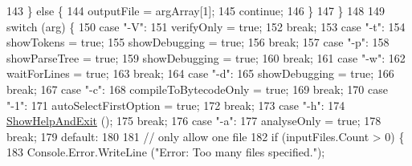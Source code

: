 \begin{DoxyCode}
143                     \} \textcolor{keywordflow}{else} \{
144                         outputFile = argArray[1];
145                         \textcolor{keywordflow}{continue};
146                     \}
147                 \}
148 
149                 \textcolor{keywordflow}{switch} (arg) \{
150                 \textcolor{keywordflow}{case} \textcolor{stringliteral}{"-V"}:
151                     verifyOnly = \textcolor{keyword}{true};
152                     \textcolor{keywordflow}{break};
153                 \textcolor{keywordflow}{case} \textcolor{stringliteral}{"-t"}:
154                     showTokens = \textcolor{keyword}{true};
155                     showDebugging = \textcolor{keyword}{true};
156                     \textcolor{keywordflow}{break};
157                 \textcolor{keywordflow}{case} \textcolor{stringliteral}{"-p"}:
158                     showParseTree = \textcolor{keyword}{true};
159                     showDebugging = \textcolor{keyword}{true};
160                     \textcolor{keywordflow}{break};
161                 \textcolor{keywordflow}{case} \textcolor{stringliteral}{"-w"}:
162                     waitForLines = \textcolor{keyword}{true};
163                     \textcolor{keywordflow}{break};
164                 \textcolor{keywordflow}{case} \textcolor{stringliteral}{"-d"}:
165                     showDebugging = \textcolor{keyword}{true};
166                     \textcolor{keywordflow}{break};
167                 \textcolor{keywordflow}{case} \textcolor{stringliteral}{"-c"}:
168                     compileToBytecodeOnly = \textcolor{keyword}{true};
169                     \textcolor{keywordflow}{break};
170                 \textcolor{keywordflow}{case} \textcolor{stringliteral}{"-1"}:
171                     autoSelectFirstOption = \textcolor{keyword}{true};
172                     \textcolor{keywordflow}{break};
173                 \textcolor{keywordflow}{case} \textcolor{stringliteral}{"-h"}:
174                     \hyperlink{a00092_a0ce7698dabf6d60f3cd33fe5d23c11b3}{ShowHelpAndExit} ();
175                     \textcolor{keywordflow}{break};
176                 \textcolor{keywordflow}{case} \textcolor{stringliteral}{"-a"}:
177                     analyseOnly = \textcolor{keyword}{true};
178                     \textcolor{keywordflow}{break};
179                 \textcolor{keywordflow}{default}:
180 
181                     \textcolor{comment}{// only allow one file}
182                     \textcolor{keywordflow}{if} (inputFiles.Count > 0) \{
183                         Console.Error.WriteLine (\textcolor{stringliteral}{"Error: Too many files specified."});

\end{DoxyCode}
